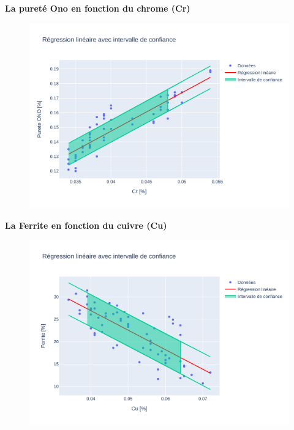 \documentclass[12pt]{article}
\begin{document}
\textbf{La pureté Ono en fonction du chrome (Cr)} 
\begin{figure}[H]
\includegraphics[width=\textwidth]{Images/Statistique/Regression_Ono_Cr.pdf} 
\end{figure}



\textbf{La Ferrite en fonction du cuivre (Cu)} 
\begin{figure}[H]
\includegraphics[width=\textwidth]{Images/Statistique/Regression_Ferrite_Cu.pdf} 
\end{figure}
\end{document}
